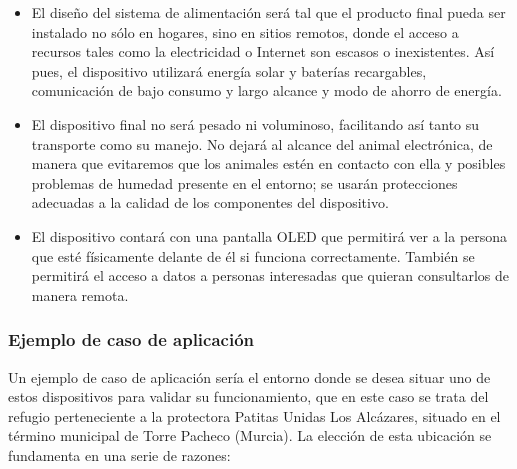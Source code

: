 \documentclass[12pt]{article}
\begin{document}
	\begin{itemize}
		\item El diseño del sistema de alimentación será tal que el producto final pueda ser instalado no sólo en hogares, sino en sitios remotos, donde el acceso a recursos tales como la electricidad o Internet son escasos o inexistentes. Así pues, el dispositivo utilizará energía solar y baterías recargables, comunicación de bajo consumo y largo alcance y modo de ahorro de energía. 
		\item El dispositivo final no será pesado ni voluminoso, facilitando así tanto su transporte como su manejo. No dejará al alcance del animal electrónica, de manera que evitaremos que los animales estén en contacto con ella y posibles problemas de humedad presente en el entorno; se usarán protecciones adecuadas a la calidad de los componentes del dispositivo.
		\item El dispositivo contará con una pantalla OLED que permitirá ver a la persona que esté físicamente delante de él si funciona correctamente. También se permitirá el acceso a datos a personas interesadas que quieran consultarlos de manera remota.

	\end{itemize}

	
	\subsubsection[Ejemplo de caso de aplicación]{Ejemplo de caso de aplicación}
	
	Un ejemplo de caso de aplicación sería el entorno donde se desea situar uno de estos dispositivos para validar su funcionamiento, que en este caso se trata del refugio perteneciente a la protectora Patitas Unidas Los Alcázares, situado en el término municipal de Torre Pacheco (Murcia).
	La elección de esta ubicación se fundamenta en una serie de razones:
	
\end{document}
